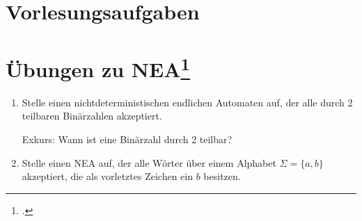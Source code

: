 \documentclass{lehramt-informatik-aufgabe}
\begin{document}
\section{Vorlesungsaufgaben
}

%

\section{Übungen zu NEA\footcite[Seite 34]{theo:fs:1}}

\begin{enumerate}

%

\item Stelle einen nichtdeterministischen endlichen Automaten auf, der
alle durch 2 teilbaren Binärzahlen akzeptiert.

Exkurs: Wann ist eine Binärzahl durch 2 teilbar?

%

\item Stelle einen NEA auf, der alle Wörter über einem Alphabet $\Sigma
= \{a, b\}$ akzeptiert, die als vorletztes Zeichen ein $b$ besitzen.
\end{enumerate}
\end{document}
